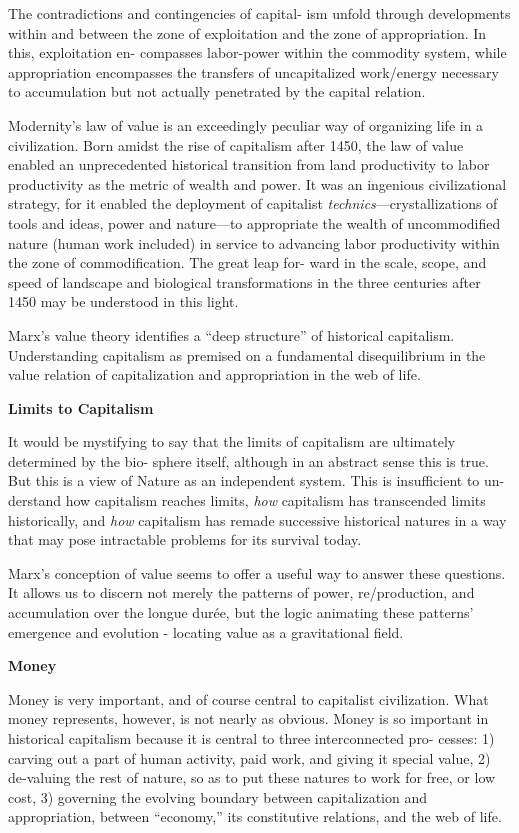 \documentclass[
]{book}
\begin{document}
The contradictions and contingencies of capital-
ism unfold through developments within and between the zone of
exploitation and the zone of appropriation. In this, exploitation en-
compasses labor-power within the commodity system, while appropriation
encompasses the transfers of uncapitalized work/energy necessary
to accumulation but not actually penetrated by the capital
relation.

Modernity's law of value is an exceedingly peculiar way of organizing
life in a civilization. Born amidst the rise of capitalism after
1450, the law of value enabled an unprecedented historical transition
from land productivity to labor productivity as the metric of wealth
and power. It was an ingenious civilizational strategy, for it enabled
the deployment of capitalist \emph{technics}---crystallizations of tools and
ideas, power and nature---to appropriate the wealth of uncommodified
nature (human work included) in service to advancing labor
productivity within the zone of commodification. The great leap for-
ward in the scale, scope, and speed of landscape and biological
transformations in the three centuries after 1450 may be understood in
this light.

Marx's value theory identifies a ``deep structure'' of historical capitalism.
Understanding capitalism as premised on a fundamental
disequilibrium in the value relation of capitalization and appropriation
in the web of life.

\textbf{Limits to Capitalism}

It would be mystifying to say
that the limits of capitalism are ultimately determined by the bio-
sphere itself, although in an abstract sense this is true. But this is a
view of Nature as an independent system. This is insufficient to un-
derstand how capitalism reaches limits, \emph{how} capitalism has transcended
limits historically, and \emph{how} capitalism has remade successive
historical natures in a way that may pose intractable problems for its
survival today.

Marx's conception of value seems to offer a useful way to answer
these questions. It allows us to discern not merely the patterns of
power, re/production, and accumulation over the longue durée, but
the logic animating these patterns' emergence and evolution
- locating value as a gravitational field.

\textbf{Money}

Money is very important, and of course central to capitalist civilization. What money
represents, however, is not nearly as obvious. Money is so important in
historical capitalism because it is central to three interconnected pro-
cesses: 1) carving out a part of human activity, paid work, and giving
it special value, 2) de-valuing the rest of nature, so as to put these
natures to work for free, or low cost, 3) governing the evolving
boundary between capitalization and appropriation, between ``economy,''
its constitutive relations, and the web of life.
\end{document}
